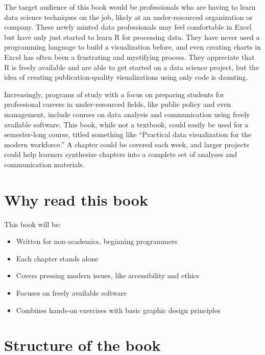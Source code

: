 \documentclass[
]{krantz}
\providecommand{\tightlist}{%
  \setlength{\itemsep}{0pt}\setlength{\parskip}{0pt}}
\begin{document}
The target audience of this book would be professionals who are having to learn data science techniques on the job, likely at an under-resourced organization or company. These newly minted data professionals may feel comfortable in Excel but have only just started to learn R for processing data. They have never used a programming language to build a visualization before, and even creating charts in Excel has often been a frustrating and mystifying process. They appreciate that R is freely available and are able to get started on a data science project, but the idea of creating publication-quality visualizations using only code is daunting.

Increasingly, programs of study with a focus on preparing students for professional careers in under-resourced fields, like public policy and even management, include courses on data analysis and communication using freely available software. This book, while not a textbook, could easily be used for a semester-long course, titled something like ``Practical data visualization for the modern workforce.'' A chapter could be covered each week, and larger projects could help learners synthesize chapters into a complete set of analyses and communication materials.

\hypertarget{why-read-this-book}{%
\section*{Why read this book}\label{why-read-this-book}}


This book will be:

\begin{itemize}
\tightlist
\item
  Written for non-academics, beginning programmers
\item
  Each chapter stands alone
\item
  Covers pressing modern issues, like accessibility and ethics
\item
  Focuses on freely available software
\item
  Combines hands-on exercises with basic graphic design principles
\end{itemize}

\hypertarget{structure-of-the-book}{%
\section*{Structure of the book}\label{structure-of-the-book}}
\end{document}
